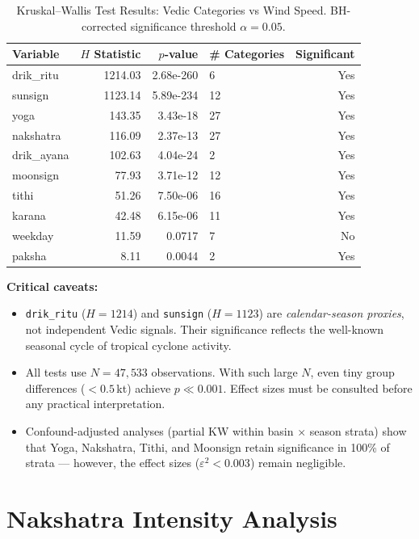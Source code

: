 \documentclass[11pt,a4paper]{article}
\begin{document}
\begin{table}[H]
  \centering
  \caption{Kruskal--Wallis Test Results: Vedic Categories vs Wind Speed.
           BH-corrected significance threshold $\alpha = 0.05$.}
  \label{tab:kw}
  \begin{tabular}{lrrl r}
    \toprule
    Variable & $H$ Statistic & $p$-value & \# Categories & Significant \\
    \midrule
  drik_ritu & 1214.03 & 2.68e-260 & 6 & Yes \\
  sunsign & 1123.14 & 5.89e-234 & 12 & Yes \\
  yoga & 143.35 & 3.43e-18 & 27 & Yes \\
  nakshatra & 116.09 & 2.37e-13 & 27 & Yes \\
  drik_ayana & 102.63 & 4.04e-24 & 2 & Yes \\
  moonsign & 77.93 & 3.71e-12 & 12 & Yes \\
  tithi & 51.26 & 7.50e-06 & 16 & Yes \\
  karana & 42.48 & 6.15e-06 & 11 & Yes \\
  weekday & 11.59 & 0.0717 & 7 & No \\
  paksha & 8.11 & 0.0044 & 2 & Yes \\
    \bottomrule
  \end{tabular}
\end{table}

\medskip
\noindent\textbf{Critical caveats:}
\begin{itemize}[noitemsep]
  \item \texttt{drik\_ritu} ($H=1214$) and \texttt{sunsign} ($H=1123$) are \emph{calendar-season
        proxies}, not independent Vedic signals. Their significance reflects the well-known
        seasonal cycle of tropical cyclone activity.
  \item All tests use $N = 47,533$ observations. With such large $N$,
        even tiny group differences ($<0.5$\,kt) achieve $p \ll 0.001$. Effect sizes must
        be consulted before any practical interpretation.
  \item Confound-adjusted analyses (partial KW within basin $\times$ season strata) show
        that Yoga, Nakshatra, Tithi, and Moonsign retain significance in 100\% of strata ---
        however, the effect sizes ($\varepsilon^2 < 0.003$) remain negligible.
\end{itemize}

\section{Nakshatra Intensity Analysis}
\end{document}
